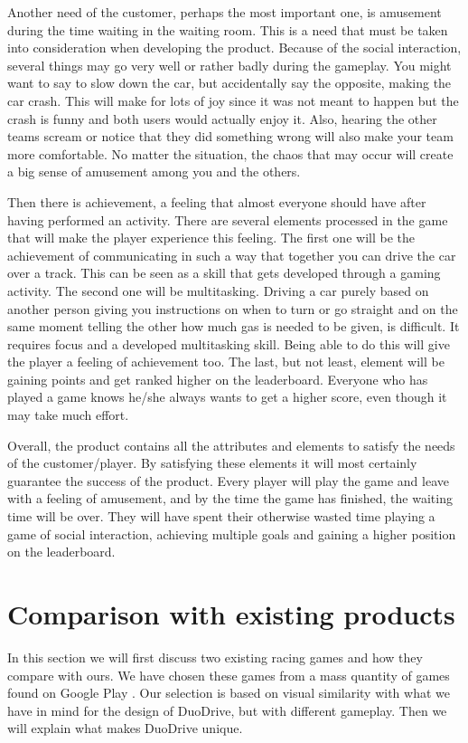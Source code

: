\documentclass[11pt,twoside,a4paper]{article}
\begin{document}
Another need of the customer, perhaps the most important one, is amusement during the time waiting in the waiting room. This is a need that must be taken into consideration when developing the product. Because of the social interaction, several things may go very well or rather badly during the gameplay. You might want to say to slow down the car, but accidentally say the opposite, making the car crash. This will make for lots of joy since it was not meant to happen but the crash is funny and both users would actually enjoy it. Also, hearing the other teams scream or notice that they did something wrong will also make your team more comfortable. No matter the situation, the chaos that may occur will create a big sense of amusement among you and the others.

Then there is achievement, a feeling that almost everyone should have after having performed an activity. There are several elements processed in the game that will make the player experience this feeling. The first one will be the achievement of communicating in such a way that together you can drive the car over a track. This can be seen as a skill that gets developed through a gaming activity. The second one will be multitasking. Driving a car purely based on another person giving you instructions on when to turn or go straight and on the same moment telling the other how much gas is needed to be given, is difficult. It requires focus and a developed multitasking skill. Being able to do this will give the player a feeling of achievement too. The last, but not least, element will be gaining points and get ranked higher on the leaderboard. Everyone who has played a game knows he/she always wants to get a higher score, even though it may take much effort.

Overall, the product contains all the attributes and elements to satisfy the needs of the customer/player. By satisfying these elements it will most certainly guarantee the success of the product. Every player will play the game and leave with a feeling of amusement, and by the time the game has finished, the waiting time will be over. They will have spent their otherwise wasted time playing a game of social interaction, achieving multiple goals and gaining a higher position on the leaderboard.


\section{Comparison with existing products}
In this section we will first discuss two existing racing games and how they compare with ours. We have chosen these games from a mass quantity of games found on Google Play \cite{googleplay}. Our selection is based on visual similarity with what we have in mind for the design of DuoDrive, but with different gameplay. Then we will explain what makes DuoDrive unique.
\end{document}
